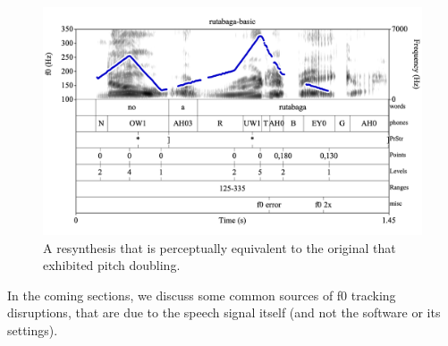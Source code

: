 \documentclass[11pt, twoside]{memoir}
\begin{document}
\begin{figure}[H]
\centering
\includegraphics[width=.875\linewidth]{Contours-rutabaga-basic-resynth.png}
\caption{A resynthesis that is perceptually equivalent to the original that exhibited pitch doubling.
\label{fig:rutabaga-resynth f0-tracking}
}
\end{figure}
In the coming sections, we discuss some common sources of f0 tracking disruptions, that are due to the speech signal itself (and not the software or its settings).
\end{document}

